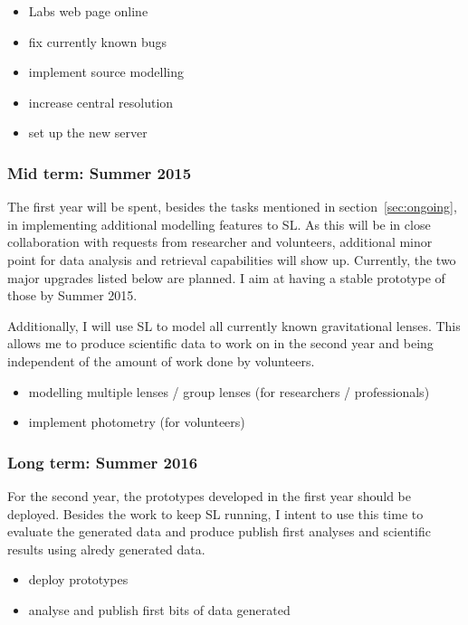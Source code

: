 \documentclass[11pt]{article}
\begin{document}
\begin{itemize}
	\item Labs web page online
  \item fix currently known bugs
  \item implement source modelling
  \item increase central resolution
  \item set up the new server
\end{itemize}


\subsubsection{Mid term: Summer 2015}

The first year will be spent, besides the tasks mentioned in section~\ref{sec:ongoing}, in implementing additional modelling features to SL.
As this will be in close collaboration with requests from researcher and volunteers, additional minor point for data analysis and retrieval capabilities will show up.
Currently, the two major upgrades listed below are planned. I aim at having a stable prototype of those by Summer 2015.

Additionally, I will use SL to model all currently known gravitational lenses.
This allows me to produce scientific data to work on in the second year and being independent of the amount of work done by volunteers.


\begin{itemize}
  \item modelling multiple lenses / group lenses (for researchers / professionals)
  \item implement photometry (for volunteers)
\end{itemize}


\subsubsection{Long term: Summer 2016}

For the second year, the prototypes developed in the first year should be deployed.
Besides the work to keep SL running, I intent to use this time to evaluate the generated data and produce publish first analyses and scientific results using alredy generated data.

\begin{itemize}
  \item deploy prototypes
  \item analyse and publish first bits of data generated
\end{itemize}
\end{document}
